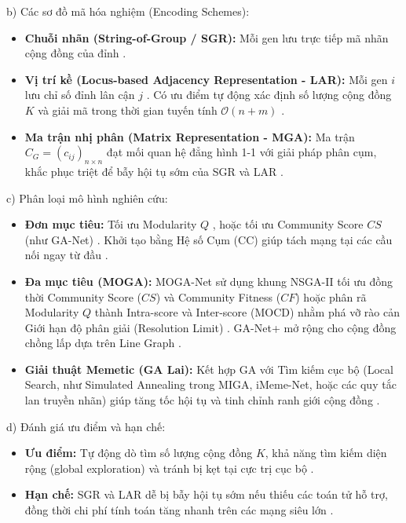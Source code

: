 \documentclass[14pt,a4paper]{extarticle}
\begin{document}
\noindent b) Các sơ đồ mã hóa nghiệm (Encoding Schemes):
\begin{itemize}
    \item \textbf{Chuỗi nhãn (String-of-Group / SGR):} Mỗi gen lưu trực tiếp mã nhãn cộng đồng của đỉnh \cite{Chen2019}.
    \item \textbf{Vị trí kề (Locus-based Adjacency Representation - LAR):} Mỗi gen $i$ lưu chỉ số đỉnh lân cận $j$ \cite{Pizzuti2008, Chen2019}. Có ưu điểm tự động xác định số lượng cộng đồng $K$ và giải mã trong thời gian tuyến tính $\mathcal{O}(n + m)$ \cite{Said2018, Baraa2021}.
    \item \textbf{Ma trận nhị phân (Matrix Representation - MGA):} Ma trận $C_G = (c_{ij})_{n \times n}$ đạt mối quan hệ đẳng hình 1-1 với giải pháp phân cụm, khắc phục triệt để bẫy hội tụ sớm của SGR và LAR \cite{Chen2019}.
\end{itemize}

\noindent c) Phân loại mô hình nghiên cứu:
\begin{itemize}
    \item \textbf{Đơn mục tiêu:} Tối ưu Modularity $Q$ \cite{Said2018, Chen2019}, hoặc tối ưu Community Score $CS$ (như GA-Net) \cite{Pizzuti2008}. Khởi tạo bằng Hệ số Cụm (CC) giúp tách mạng tại các cầu nối ngay từ đầu \cite{Said2018}.
    \item \textbf{Đa mục tiêu (MOGA):} MOGA-Net sử dụng khung NSGA-II tối ưu đồng thời Community Score ($CS$) và Community Fitness ($CF$) hoặc phân rã Modularity $Q$ thành Intra-score và Inter-score (MOCD) nhằm phá vỡ rào cản Giới hạn độ phân giải (Resolution Limit) \cite{Baraa2021, Gong2016}. GA-Net+ mở rộng cho cộng đồng chồng lấp dựa trên Line Graph \cite{Baraa2021, Bedi2016}.
    \item \textbf{Giải thuật Memetic (GA Lai):} Kết hợp GA với Tìm kiếm cục bộ (Local Search, như Simulated Annealing trong MIGA, iMeme-Net, hoặc các quy tắc lan truyền nhãn) giúp tăng tốc hội tụ và tinh chỉnh ranh giới cộng đồng \cite{Chen2019, Beldi2025, Gong2012Memetic}.
\end{itemize}

\noindent d) Đánh giá ưu điểm và hạn chế:
\begin{itemize}
    \item \textbf{Ưu điểm:} Tự động dò tìm số lượng cộng đồng $K$, khả năng tìm kiếm diện rộng (global exploration) và tránh bị kẹt tại cực trị cục bộ \cite{Said2018, Chen2019}.
    \item \textbf{Hạn chế:} SGR và LAR dễ bị bẫy hội tụ sớm nếu thiếu các toán tử hỗ trợ, đồng thời chi phí tính toán tăng nhanh trên các mạng siêu lớn \cite{Chen2019}.
\end{itemize}
\end{document}
